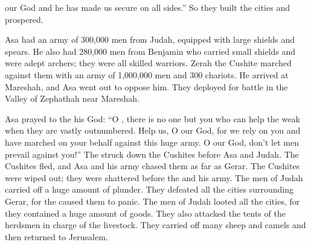 {{}
our God
and he has made
us secure
on all sides.”
So they built
the cities and prospered.
\par }{\PP {}Asa
had an army
of 300,000
men from Judah,
equipped
with large shields
and spears.
He also had 280,000
men from Benjamin
who carried
small shields
and were adept
archers;
they were all
skilled
warriors.
Zerah
the Cushite
marched
against
them with an army
of 1,000,000
men and 300
chariots.
He arrived
at
Mareshah,
and Asa
went out
to oppose
him. They deployed
for battle
in the Valley
of Zephathah
near Mareshah.
\par }{\PP {}Asa
prayed
to
the {}
his God: “O
{}, there is no
one but you
who can help
the weak when
they are vastly
outnumbered.
Help
us, O
{}
our God,
for
we rely
on you and have marched
on your behalf against
this
huge
army. O
{}
our God,
don’t
let men
prevail
against
you!”
The
{}
struck
down the Cushites
before
Asa
and Judah.
The Cushites
fled,
and Asa
and his army
chased
them as far
as Gerar.
The Cushites
were wiped out;
they
were shattered
before
the {}
and his army.
The men of Judah carried
off a huge amount
of plunder.
They defeated
all
the cities
surrounding
Gerar,
for
the {}
caused
them to panic.
The men of Judah looted
all
the cities,
for
they contained a huge amount
of goods.
They also
attacked
the tents
of the herdsmen in charge of the livestock.
They carried
off many
sheep
and camels
and then returned
to Jerusalem.

}

